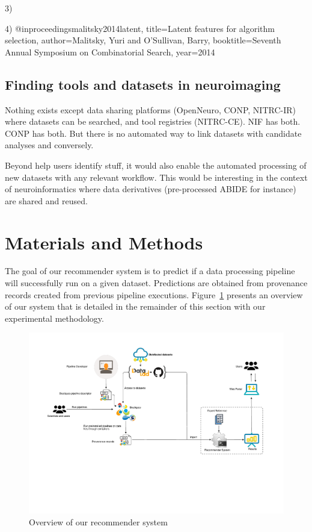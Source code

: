 \documentclass[conference]{IEEEtran}
\begin{document}
3)~\cite{bischl2016aslib}

4) @inproceedings{malitsky2014latent,
  title={Latent features for algorithm selection},
  author={Malitsky, Yuri and O'Sullivan, Barry},
  booktitle={Seventh Annual Symposium on Combinatorial Search},
  year={2014}
}


\subsection{Finding tools and datasets in neuroimaging}

Nothing exists except data sharing platforms (OpenNeuro, CONP, NITRC-IR) where datasets can be searched, and tool registries (NITRC-CE). NIF has both. CONP has both. But there is no automated way to link datasets with candidate analyses and conversely. 

Beyond help users identify stuff, it would also enable the automated processing of 
new datasets with any relevant workflow. This would be interesting in the context of 
neuroinformatics where data derivatives (pre-processed ABIDE for instance) are shared and reused.

\section{Materials and Methods}

The goal of our recommender system is to predict if a data processing
pipeline will successfully run on a given dataset. Predictions are obtained
from provenance records created from previous pipeline executions.
Figure~\ref{fig:method} presents an overview of our system that is detailed
in the remainder of this section with our experimental methodology.

\begin{figure}[ht]
  \centering
  \includegraphics[width=\textwidth]{figures/Methodology.pdf}%
  \caption{Overview of our recommender system }
  \label{fig:method}
  \end{figure}  
\end{document}
